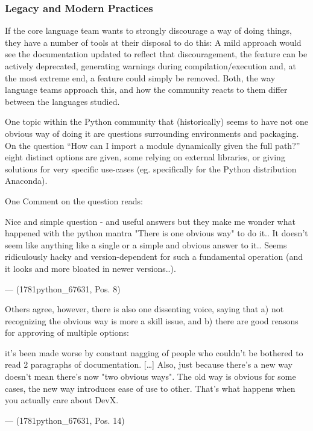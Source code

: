 \subsubsection{Legacy and Modern Practices}

If the core language team wants to strongly discourage a way of doing things, they have a number of tools at their
disposal to do this: A mild approach would see the documentation updated to reflect that discouragement, the feature can
be actively deprecated, generating warnings during compilation/execution and, at the most extreme end, a feature could
simply be removed. Both, the way language teams approach this, and how the community reacts to them differ between the
languages studied.

One topic within the Python community that (historically) seems to have not one obvious way of doing it are questions
surrounding environments and packaging. On the question “How can I import a module dynamically given the full path?”
eight distinct options are given, some relying on external libraries, or giving solutions for very specific use-cases
(eg. specifically for the Python distribution Anaconda).

One Comment on the question reads:

\begin{displayquote}
    Nice and simple question - and useful answers but they make me wonder what happened with the python mantra
    "There is one obvious way" to do it.. It doesn't seem like anything like a single or a simple and obvious answer to it..
    Seems ridiculously hacky and version-dependent for such a fundamental operation (and it looks and more bloated in
    newer versions..).

    --- (1781python\_67631, Pos. 8)
\end{displayquote}

Others agree, however, there is also one dissenting voice, saying that a) not recognizing the obvious way is more a
skill issue, and b) there are good reasons for approving of multiple options:

\begin{displayquote}
    [\ldots] it's been made worse by constant nagging of people who couldn't be bothered to read 2 paragraphs of documentation.
    [\ldots] Also, just because there's a new way doesn't mean there's now "two obvious ways". The old way is obvious for
    some cases, the new way introduces ease of use to other. That's what happens when you actually care about DevX.

    --- (1781python\_67631, Pos. 14)
\end{displayquote}

